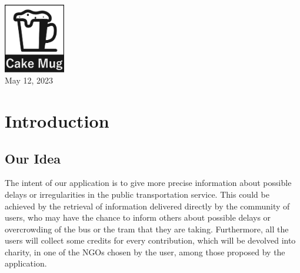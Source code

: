 \documentclass[a4paper, 11pt]{report}
\begin{document}
\begin{titlepage}


	\vfill\vfill\vfill %


	\includegraphics[width=0.2\textwidth]{logo-bw.pdf}\\[1cm] %


	{\large May 12, 2023} %

	\vfill %

\end{titlepage}

\tableofcontents

\chapter{Introduction}
\section{Our Idea}\label{sec:our-idea}
The intent of our application is to give more precise information about possible delays or irregularities in the public transportation service. This could be achieved by the retrieval of information delivered directly by the community of users, who may have the chance to inform others about possible delays or overcrowding of the bus or the tram that they are taking.
Furthermore, all the users will collect some credits for every contribution, which will be devolved into charity, in one of the NGOs chosen by the user, among those proposed by the application.
\end{document}
